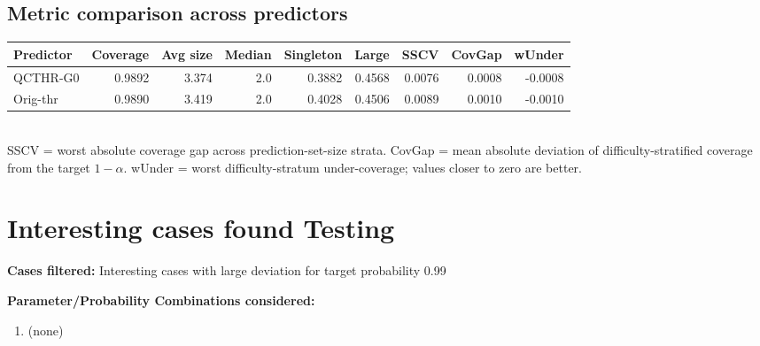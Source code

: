 \documentclass[parskip=half]{scrartcl}
\begin{document}
\subsection{Metric comparison across predictors}
\begin{tabular}{l r r r r r r r r}
\hline
Predictor & Coverage & Avg size & Median & Singleton & Large & SSCV & CovGap & wUnder \\
\hline
QCTHR-G0 & 0.9892 & 3.374 & 2.0 & 0.3882 & 0.4568 & 0.0076 & 0.0008 & -0.0008 \\
Orig-thr & 0.9890 & 3.419 & 2.0 & 0.4028 & 0.4506 & 0.0089 & 0.0010 & -0.0010 \\
\hline
\end{tabular}\\[0.5em]
\textsf{\scriptsize SSCV = worst absolute coverage gap across prediction-set-size strata. CovGap = mean absolute deviation of difficulty-stratified coverage from the target $1-\alpha$. wUnder = worst difficulty-stratum under-coverage; values closer to zero are better.}\\
\section{Interesting cases found Testing}
\textbf{Cases filtered:} Interesting cases with large deviation for target probability 0.99


\textbf{Parameter/Probability Combinations considered:}\begin{enumerate}
\item (none)
\end{enumerate}
        
\end{document}
